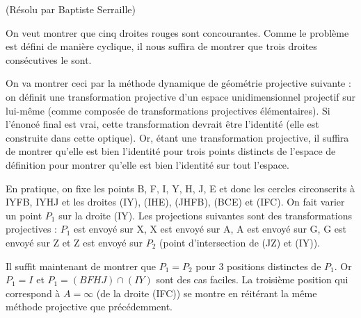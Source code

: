 \begin{sol}[97](Résolu par Baptiste Serraille)

On veut montrer que cinq droites rouges sont concourantes. Comme le problème est d\'efini de manière cyclique, il nous suffira de montrer que trois droites cons\'ecutives le sont. 

On va montrer ceci par la m\'ethode dynamique de g\'eom\'etrie projective suivante : 
on d\'efinit une transformation projective d'un espace unidimensionnel projectif sur lui-même (comme compos\'ee de transformations projectives \'el\'ementaires). Si l'\'enonc\'e final est vrai, cette transformation devrait être l'identit\'e (elle est construite dans cette optique). Or, \'etant une transformation projective, il suffira de montrer qu'elle est bien l'identit\'e pour trois points distincts de l'espace de d\'efinition pour montrer qu'elle est bien l'identit\'e sur tout l'espace. 

En pratique, on fixe les points B, F, I, Y, H, J, E et donc les cercles circonscrits à IYFB, IYHJ et les droites (IY), (IHE), (JHFB), (BCE) et (IFC). On fait varier un point $P_1$ sur la droite (IY). Les projections suivantes sont des transformations projectives : $P_1$ est envoy\'e sur X, X est envoy\'e sur A, A est envoy\'e sur G, G est envoy\'e sur Z et Z est envoy\'e sur $P_2$ (point d'intersection de (JZ) et (IY)). 

Il suffit maintenant de montrer que $P_1=P_2$ pour $3$ positions distinctes de $P_1$. Or $P_1=I$ et $P_1=(BFHJ)\cap (IY)$ sont des cas faciles. La troisième position qui correspond à $A = \infty$ (de la droite (IFC)) se montre en r\'eit\'erant la même m\'ethode projective que pr\'ec\'edemment. 
	
\end{sol}

